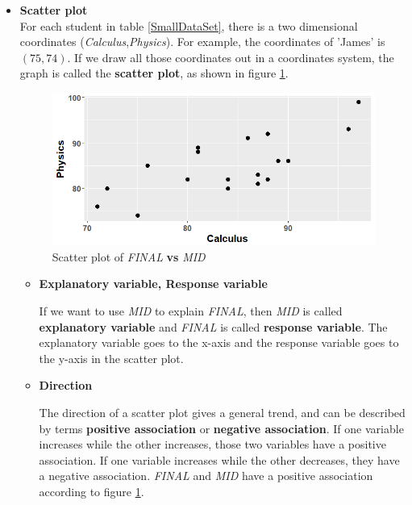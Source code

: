 \documentclass[a4paper, 12pt,twoside]{book}
\begin{document}
\begin{itemize}
 \item \textbf{Scatter plot}\vspace{0.3cm}\\
 For each student in table \ref{SmallDataSet}, there is a two dimensional coordinates (\textit{Calculus},\textit{Physics}). For example, the coordinates of 'James' is $(75, 74)$. If we draw all those coordinates out in a coordinates system, the graph is called the \textbf{scatter plot}, as shown in figure \ref{ScatterPlot}.
 
 \begin{figure}[H]
\centering
\includegraphics[scale=0.5]{ScatterPlot.png}
\caption{Scatter plot of \textit{FINAL} \textbf{vs} \textit{MID}}
\label{ScatterPlot}
\end{figure}

\vspace{3cm}

\begin{itemize}[leftmargin = 0.5cm]
 \item \textbf{Explanatory variable, Response variable}
 \vspace{0.6cm}
 
 If we want to use \textit{MID} to explain \textit{FINAL}, then \textit{MID} is called \textbf{explanatory variable} and \textit{FINAL} is called \textbf{response variable}. The explanatory variable goes to the x-axis and the response variable goes to the y-axis in the scatter plot.
 \vspace{0.6cm}
 
 \item \textbf{Direction}
 \vspace{0.6cm}
 
 The direction of a scatter plot gives a general trend, and can be described by terms \textbf{positive association} or \textbf{negative association}. If one variable increases while the other increases, those two variables have a positive association. If one variable increases while the other decreases, they have a negative association. \textit{FINAL} and \textit{MID} have a positive association according to figure \ref{ScatterPlot}.
 

\end{itemize}
\end{itemize}
\end{document}
